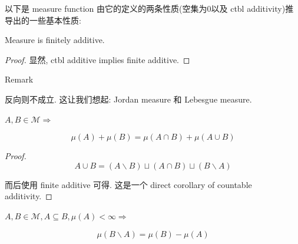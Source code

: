 以下是 measure function 由它的定义的两条性质(空集为0以及 ctbl additivity)推导出的一些基本性质:

\begin{lemma}{}

Measure is finitely additive.

\end{lemma}

\begin{proof}

显然, ctbl additive implies finite additive.

\end{proof}

\begin{qlremark}{Remark}

反向则不成立. 这让我们想起: Jordan measure 和 Lebesgue measure.

\end{qlremark}

\begin{lemma}

\(A,B \in \mathcal{M}\Longrightarrow\)

\[\mu(A) + \mu(B) = \mu(A \cap B) + \mu(A \cup B)\]

\end{lemma}

\begin{proof}

\[A \cup B = (A\backslash B) \sqcup (A \cap B) \sqcup (B\backslash A)\]

而后使用 finite additive 可得. 这是一个 direct corollary of countable additivity.

\end{proof}

\begin{corollary}

\(A,B \in \mathcal{M},A \subseteq B,\mu(A) < \infty\Longrightarrow\)

\[\mu(B\backslash A) = \mu(B) - \mu(A)\]

\end{corollary}

